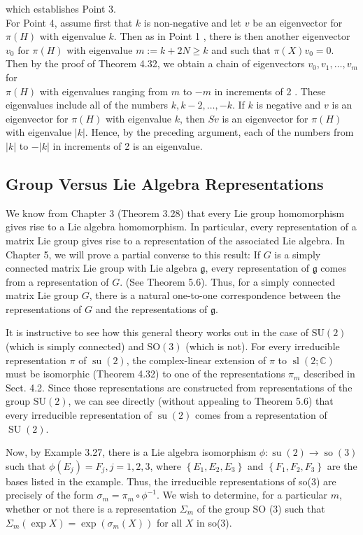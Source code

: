 \documentclass[10pt, letterpaper]{article}
\begin{document}
which establishes Point 3.\\
For Point 4, assume first that $k$ is non-negative and let $v$ be an eigenvector for $\pi(H)$ with eigenvalue $k$. Then as in Point 1 , there is then another eigenvector $v_{0}$ for $\pi(H)$ with eigenvalue $m:=k+2 N \geq k$ and such that $\pi(X) v_{0}=0$. Then by the proof of Theorem 4.32, we obtain a chain of eigenvectors $v_{0}, v_{1}, \ldots, v_{m}$ for\\
$\pi(H)$ with eigenvalues ranging from $m$ to $-m$ in increments of 2 . These eigenvalues include all of the numbers $k, k-2, \ldots,-k$. If $k$ is negative and $v$ is an eigenvector for $\pi(H)$ with eigenvalue $k$, then $S v$ is an eigenvector for $\pi(H)$ with eigenvalue $|k|$. Hence, by the preceding argument, each of the numbers from $|k|$ to $-|k|$ in increments of 2 is an eigenvalue.

\subsection*{Group Versus Lie Algebra Representations}
We know from Chapter 3 (Theorem 3.28) that every Lie group homomorphism gives rise to a Lie algebra homomorphism. In particular, every representation of a matrix Lie group gives rise to a representation of the associated Lie algebra. In Chapter 5, we will prove a partial converse to this result: If $G$ is a simply connected matrix Lie group with Lie algebra $\mathfrak{g}$, every representation of $\mathfrak{g}$ comes from a representation of $G$. (See Theorem 5.6). Thus, for a simply connected matrix Lie group $G$, there is a natural one-to-one correspondence between the representations of $G$ and the representations of $\mathfrak{g}$.

It is instructive to see how this general theory works out in the case of $\mathrm{SU}(2)$ (which is simply connected) and $\mathrm{SO}(3)$ (which is not). For every irreducible representation $\pi$ of $\operatorname{su}(2)$, the complex-linear extension of $\pi$ to $\operatorname{sl}(2 ; \mathbb{C})$ must be isomorphic (Theorem 4.32) to one of the representations $\pi_{m}$ described in Sect. 4.2. Since those representations are constructed from representations of the group $\mathrm{SU}(2)$, we can see directly (without appealing to Theorem 5.6) that every irreducible representation of $\operatorname{su}(2)$ comes from a representation of $\operatorname{SU}(2)$.

Now, by Example 3.27, there is a Lie algebra isomorphism $\phi: \operatorname{su}(2) \rightarrow \operatorname{so}(3)$ such that $\phi\left(E_{j}\right)=F_{j}, j=1,2,3$, where $\left\{E_{1}, E_{2}, E_{3}\right\}$ and $\left\{F_{1}, F_{2}, F_{3}\right\}$ are the bases listed in the example. Thus, the irreducible representations of so(3) are precisely of the form $\sigma_{m}=\pi_{m} \circ \phi^{-1}$. We wish to determine, for a particular $m$, whether or not there is a representation $\Sigma_{m}$ of the group SO (3) such that $\Sigma_{m}(\exp X)=\exp \left(\sigma_{m}(X)\right)$ for all $X$ in so(3).
\end{document}
